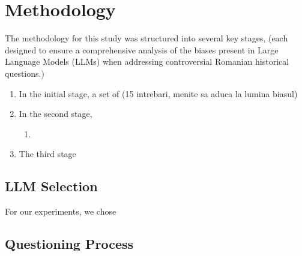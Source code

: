 \documentclass[11pt]{article}
\begin{document}
    
    
    
    
    

\section{Methodology}
The methodology for this study was structured into several key stages,
(each designed to ensure a comprehensive analysis of the biases present in Large Language Models (LLMs) when addressing controversial Romanian historical questions.)
\begin{enumerate}
    \item In the initial stage, a set of (15 intrebari, menite sa aduca la lumina biasul)
    \item In the second stage, 
    \begin{enumerate} %
        \item 
    \end{enumerate}
    \item The third stage
\end{enumerate}


\subsection{LLM Selection}
For our experiments, we chose

\subsection{Questioning Process}
\end{document}
